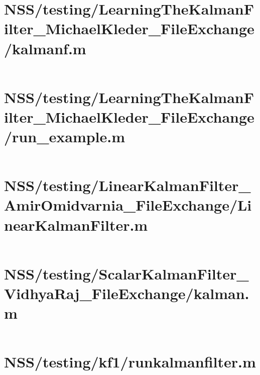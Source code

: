\pagebreak
\section*{NSS/testing/LearningTheKalmanFilter\_MichaelKleder\_FileExchange/kalmanf.m}\label{code:NSS/testing/LearningTheKalmanFilter_MichaelKleder_FileExchange/kalmanf.m}
\inputminted[linenos,fontsize=\scriptsize]{matlab}{/home/dcouture/git/mathyourlife/TSatPy/beta_versions/matlab_object_oriented/testing/LearningTheKalmanFilter_MichaelKleder_FileExchange/kalmanf.m}

\pagebreak
\section*{NSS/testing/LearningTheKalmanFilter\_MichaelKleder\_FileExchange/run\_example.m}\label{code:NSS/testing/LearningTheKalmanFilter_MichaelKleder_FileExchange/run_example.m}
\inputminted[linenos,fontsize=\scriptsize]{matlab}{/home/dcouture/git/mathyourlife/TSatPy/beta_versions/matlab_object_oriented/testing/LearningTheKalmanFilter_MichaelKleder_FileExchange/run_example.m}

\pagebreak
\section*{NSS/testing/LinearKalmanFilter\_AmirOmidvarnia\_FileExchange/LinearKalmanFilter.m}\label{code:NSS/testing/LinearKalmanFilter_AmirOmidvarnia_FileExchange/LinearKalmanFilter.m}
\inputminted[linenos,fontsize=\scriptsize]{matlab}{/home/dcouture/git/mathyourlife/TSatPy/beta_versions/matlab_object_oriented/testing/LinearKalmanFilter_AmirOmidvarnia_FileExchange/LinearKalmanFilter.m}

\pagebreak
\section*{NSS/testing/ScalarKalmanFilter\_VidhyaRaj\_FileExchange/kalman.m}\label{code:NSS/testing/ScalarKalmanFilter_VidhyaRaj_FileExchange/kalman.m}
\inputminted[linenos,fontsize=\scriptsize]{matlab}{/home/dcouture/git/mathyourlife/TSatPy/beta_versions/matlab_object_oriented/testing/ScalarKalmanFilter_VidhyaRaj_FileExchange/kalman.m}

\pagebreak
\section*{NSS/testing/kf1/runkalmanfilter.m}\label{code:NSS/testing/kf1/runkalmanfilter.m}
\inputminted[linenos,fontsize=\scriptsize]{matlab}{/home/dcouture/git/mathyourlife/TSatPy/beta_versions/matlab_object_oriented/testing/kf1/runkalmanfilter.m}

